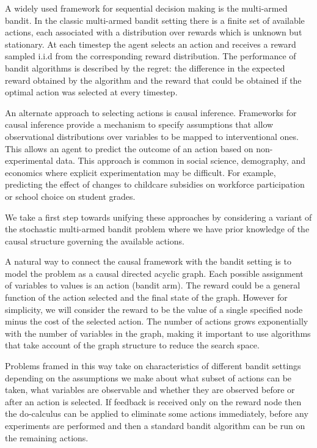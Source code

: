 \documentclass{article}
\theoremstyle{plain}
\theoremstyle{definition}
\begin{document}

A widely used framework for sequential decision making is the multi-armed bandit. In the classic multi-armed bandit setting there is a finite set of available actions, each associated with a distribution over rewards which is unknown but stationary. At each timestep the agent selects an action and receives a reward sampled i.i.d from the corresponding reward distribution. The performance of bandit algorithms is described by the regret: the difference in the expected reward obtained by the algorithm and the reward that could be obtained if the optimal action was selected at every timestep. 

An alternate approach to selecting actions is causal inference. Frameworks for causal inference provide a mechanism to specify assumptions that allow observational distributions over variables to be mapped to interventional ones. This allows an agent to predict the outcome of an action based on non-experimental data. This approach is common in social science, demography, and economics where explicit experimentation may be difficult. For example, predicting the effect of changes to childcare subsidies on workforce participation or school choice on student grades. 

We take a first step towards unifying these approaches by considering a variant of the stochastic multi-armed bandit problem where we have prior knowledge of the causal structure governing the available actions. 

A natural way to connect the causal framework with the bandit setting is to model the problem as a causal directed acyclic graph. Each possible assignment of variables to values is an action (bandit arm). The reward could be a general function of the action selected and the final state of the graph. However for simplicity, we will consider the reward to be the value of a single specified node minus the cost of the selected action. The number of actions grows exponentially with the number of variables in the graph, making it important to use algorithms that take account of the graph structure to reduce the search space. 

Problems framed in this way take on characteristics of different bandit settings depending on the assumptions we make about what subset of actions can be taken, what variables are observable and whether they are observed before or after an action is selected. If feedback is received only on the reward node then the do-calculus can be applied to eliminate some actions immediately, before any experiments are performed and then a standard bandit algorithm can be run on the remaining actions. 
\end{document}
